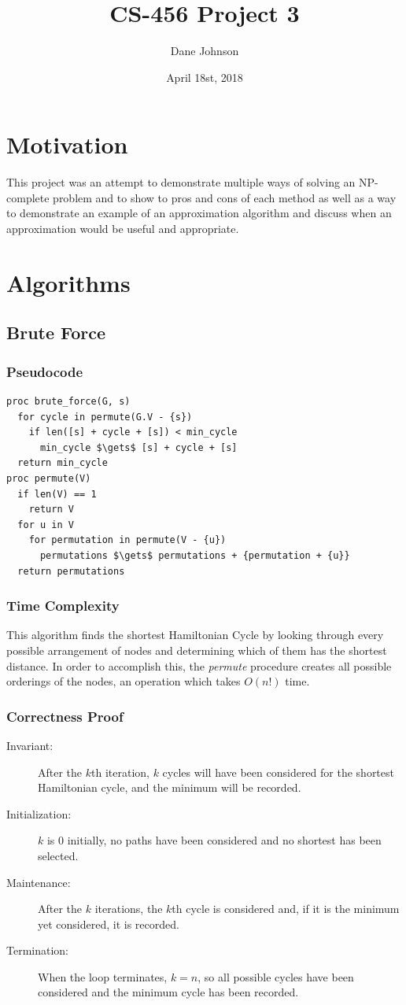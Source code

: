 \documentclass[a4paper,12pt]{article}
\title{CS-456 Project 3}
\author{Dane Johnson}
\date{April 18st, 2018}
\begin{document}
\maketitle
\newpage
\section{Motivation}

This project was an attempt to demonstrate multiple ways of solving an NP-complete problem and to show to pros and cons
of each method as well as a way to demonstrate an example of an approximation algorithm and discuss when an approximation
would be useful and appropriate.

\section{Algorithms}
\subsection{Brute Force}
\subsubsection{Pseudocode}
\begin{lstlisting}[mathescape=true]
proc brute_force(G, s)
  for cycle in permute(G.V - {s})
    if len([s] + cycle + [s]) < min_cycle
      min_cycle $\gets$ [s] + cycle + [s]
  return min_cycle
proc permute(V)
  if len(V) == 1
    return V
  for u in V
    for permutation in permute(V - {u})
      permutations $\gets$ permutations + {permutation + {u}}
  return permutations
\end{lstlisting}
\subsubsection{Time Complexity}
This algorithm finds the shortest Hamiltonian Cycle by looking through every possible arrangement of nodes and determining which of them has the shortest distance. In order to accomplish this, the {\it permute} procedure creates all possible orderings of the nodes, an operation which takes $O(n!)$ time.
\subsubsection{Correctness Proof}
\begin{description}
\item [Invariant: ] After the $k$th iteration, $k$ cycles will have been considered for the shortest Hamiltonian cycle, and the minimum will be recorded.
\item [Initialization: ] $k$ is 0 initially, no paths have been considered and no shortest has been selected.
\item [Maintenance: ] After the $k$ iterations, the $k$th cycle is considered and, if it is the minimum yet considered, it is recorded.
\item [Termination: ] When the loop terminates, $k = n$, so all possible cycles have been considered and the minimum cycle has been recorded.
\end{description}
\end{document}
